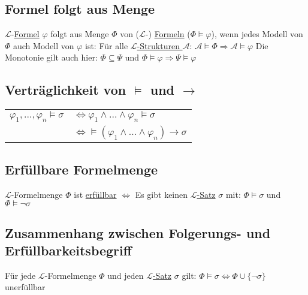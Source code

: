 \documentclass[12pt,a4paper]{article} %
\begin{document}
	\subsection{Formel folgt aus Menge}
	$\mathcal{L}$-\hyperref[Formel]{Formel} $\varphi$ folgt aus Menge $\Phi$ von ($\mathcal{L}$-) \hyperref[Formel]{Formeln} ($\Phi \hyperref[Erfullbar]{\vDash} \varphi$), wenn jedes Modell von $\Phi$ auch Modell von $\varphi$ ist: \newline
	Für alle \hyperref[Struktur]{$\mathcal{L}$-Strukturen $\mathcal{A}$}: $\mathcal{A} \hyperref[Erfullbar]{\vDash} \Phi \Rightarrow \mathcal{A} \hyperref[Erfullbar]{\vDash} \varphi$ \newline
	Die Monotonie gilt auch hier: \newline
	$\Phi \subseteq \Psi$ und $\Phi \hyperref[Erfullbar]{\vDash} \varphi \Rightarrow \Psi \hyperref[Erfullbar]{\vDash} \varphi$
	
	\subsection{Verträglichkeit von $\vDash$ und $\rightarrow$}
	\begin{tabular}{l l}
		$\varphi_1, ..., \varphi_n \hyperref[Erfullbar]{\vDash} \sigma$ & $\Leftrightarrow \varphi_1 \land ... \land \varphi_n \hyperref[Erfullbar]{\vDash} \sigma$ \\
		& $\Leftrightarrow \hyperref[Erfullbar]{\vDash} (\varphi_1 \land ... \land \varphi_n) \rightarrow \sigma$
	\end{tabular}

	\subsection{Erfüllbare Formelmenge}
	$\mathcal{L}$-Formelmenge $\Phi$ ist \hyperref[Erfullbar]{erfüllbar} $\Leftrightarrow$ Es gibt keinen \hyperref[LSatz]{$\mathcal{L}$-Satz} $\sigma$ mit: $\Phi \hyperref[Erfullbar]{\vDash} \sigma$ und $\Phi \hyperref[Erfullbar]{\vDash} \neg \sigma$
	
	\subsection{Zusammenhang zwischen Folgerungs- und Erfüllbarkeitsbegriff}
	Für jede $\mathcal{L}$-Formelmenge $\Phi$ und jeden \hyperref[LSatz]{$\mathcal{L}$-Satz} $\sigma$ gilt: $\Phi \hyperref[Erfullbar]{\vDash} \sigma \Leftrightarrow \Phi \cup \{\neg \sigma\}$ unerfüllbar
	
\end{document}
